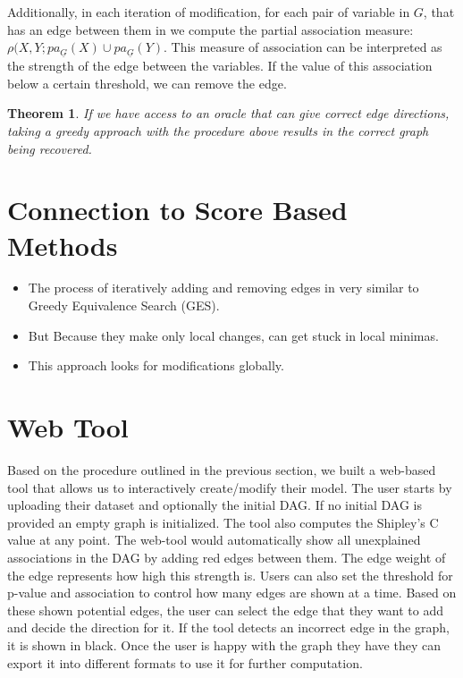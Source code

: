 \documentclass[letterpaper]{article} %
\newtheorem{theorem}{Theorem}
\begin{document}
Additionally, in each iteration of modification, for each pair of variable in $
G $, that has an edge between them in we compute the partial association
measure: $ \rho(X, Y; pa_{\underline{G}}(X) \cup pa_{\underline{G}}(Y) $. This
measure of association can be interpreted as the strength of the edge between
the variables. If the value of this association below a certain threshold, we
can remove the edge.


\begin{theorem}
	If we have access to an oracle that can give correct edge directions, taking a
	greedy approach with the procedure above results in the correct graph
	being recovered. 
\end{theorem}

\section{Connection to Score Based Methods}
\begin{itemize}
	\item The process of iteratively adding and removing edges in very similar to
		Greedy Equivalence Search (GES).
	\item But Because they make only local changes, can get stuck in local minimas.
	\item This approach looks for modifications globally.
\end{itemize}


\section{Web Tool}
\label{sec:web}
Based on the procedure outlined in the previous section, we built a web-based
tool that allows us to interactively create/modify their model. The user
starts by uploading their dataset and optionally the initial DAG. If no initial
DAG is provided an empty graph is initialized. The tool also computes the
Shipley's C value at any point. The web-tool would automatically show all
unexplained associations in the DAG by adding red edges between them. The edge
weight of the edge represents how high this strength is. Users can also set the
threshold for p-value and association to control how many edges are shown at a
time. Based on these shown potential edges, the user can select the edge that
they want to add and decide the direction for it. If the tool detects an
incorrect edge in the graph, it is shown in black. Once the user is happy with
the graph they have they can export it into different formats to use it for
further computation.
\end{document}
